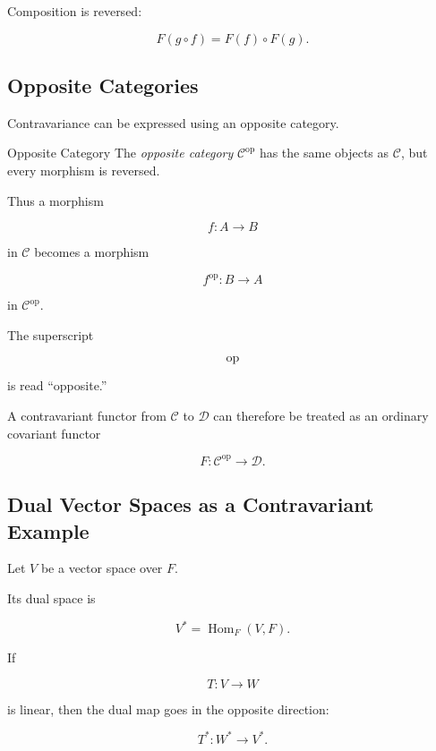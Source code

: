 Composition is reversed:

\[ F(g\circ f)=F(f)\circ F(g). \]

\subsection{Opposite Categories}
\label{subsec:opposite-categories}

Contravariance can be expressed using an opposite category.

\begin{definitionbox}{Opposite Category}
The \emph{opposite category} \(\mathcal C^{\mathrm{op}}\) has the same
objects as \(\mathcal C\), but every morphism is reversed.
\end{definitionbox}

Thus a morphism

\[ f:A\to B \]

in \(\mathcal C\) becomes a morphism

\[ f^{\mathrm{op}}:B\to A \]

in \(\mathcal C^{\mathrm{op}}\).

The superscript

\[ \mathrm{op} \]

is read ``opposite.''

A contravariant functor from \(\mathcal C\) to \(\mathcal D\) can therefore
be treated as an ordinary covariant functor

\[ F:\mathcal C^{\mathrm{op}}\to\mathcal D. \]

\subsection{Dual Vector Spaces as a Contravariant Example}
\label{subsec:dual-space-functor}

Let \(V\) be a vector space over \(F\).

Its dual space is

\[ V^*=\operatorname{Hom}_F(V,F). \]

If

\[ T:V\to W \]

is linear, then the dual map goes in the opposite direction:

\[ T^*:W^*\to V^*. \]

